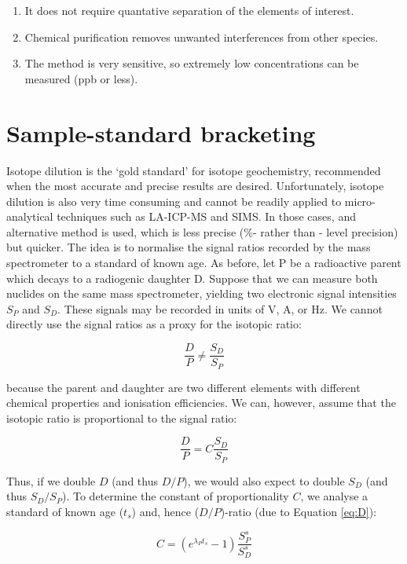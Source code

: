 \documentclass{book}
\begin{document}
\begin{enumerate}
\item It does not require quantative separation of the elements of
  interest.
\item Chemical purification removes unwanted interferences from other
  species.
\item The method is very sensitive, so extremely low concentrations
  can be measured (ppb or less).
\end{enumerate}

\section{Sample-standard bracketing}
\label{sec:bracketing}

Isotope dilution is the `gold standard' for isotope geochemistry,
recommended when the most accurate and precise results are
desired. Unfortunately, isotope dilution is also very time consuming
and cannot be readily applied to micro-analytical techniques such as
LA-ICP-MS and SIMS. In those cases, and alternative method is used,
which is less precise (\%- rather than \permil- level precision) but
quicker.  The idea is to normalise the signal ratios recorded by the
mass spectrometer to a standard of known age.  As before, let P be a
radioactive parent which decays to a radiogenic daughter D. Suppose
that we can measure both nuclides on the same mass spectrometer,
yielding two electronic signal intensities $S_P$ and $S_D$. These
signals may be recorded in units of V, A, or Hz. We cannot directly
use the signal ratios as a proxy for the isotopic ratio:

$$\frac{D}{P} \neq \frac{S_D}{S_P}$$

because the parent and daughter are two different elements with
different chemical properties and ionisation efficiencies. We can,
however, assume that the isotopic ratio is proportional to the signal
ratio:

\begin{equation}
\frac{D}{P} = C \frac{S_D}{S_P}
\label{eq:eqC}
\end{equation}

Thus, if we double $D$ (and thus $D/P$), we would also expect to
double $S_D$ (and thus $S_D/S_P$). To determine the constant of
proportionality $C$, we analyse a standard of known age ($t_s$) and,
hence ($D/P$)-ratio (due to Equation \ref{eq:D}):

\begin{equation}
C = \left(e^{\lambda_Pt_s} - 1\right) \frac{S^s_P}{S^s_D}
\label{eq:const}
\end{equation}
\end{document}
